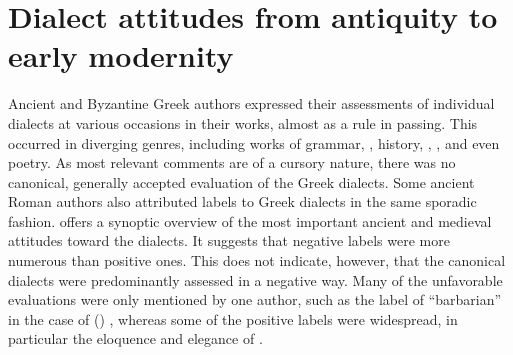 \section{Dialect attitudes from antiquity to early modernity}\label{sec:7.2}


Ancient and Byzantine Greek authors expressed their assessments of individual dialects at various occasions in their works, almost as a rule in passing. This occurred in diverging genres, including works of grammar, , history, , , and even poetry. As most relevant comments are of a cursory nature, there was no canonical, generally accepted evaluation of the Greek dialects. Some ancient Roman authors also attributed labels to Greek dialects in the same sporadic fashion.  offers a synoptic overview of the most important ancient and medieval attitudes toward the dialects. It suggests that negative labels were more numerous than positive ones. This does not indicate, however, that the canonical dialects were predominantly assessed in a negative way. Many of the unfavorable evaluations were only mentioned by one author, such as the label of “barbarian” in the case of () , whereas some of the positive labels were widespread, in particular the eloquence and elegance of .

